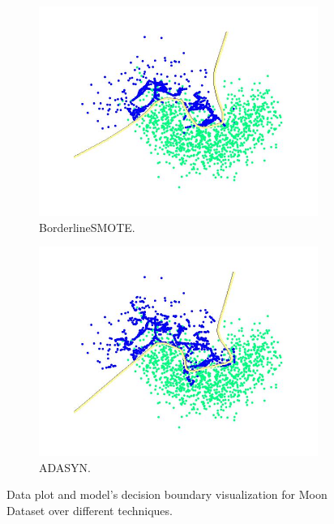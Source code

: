 \begin{figure}[th]
\begin{subfigure}[]{0.3\linewidth}
		\includegraphics[width=\linewidth]{Figures/moon/Training_Data_PLot_BorderlineSMOTE}
		\caption{BorderlineSMOTE.}
		\label{fig:border_smote_moon}
	\end{subfigure}
	\hspace{0.1em}%
	\begin{subfigure}[]{0.3\linewidth}
		\includegraphics[width=\linewidth]{Figures/moon/Training_Data_PLot_ADASYN}
		\caption{ADASYN. }
		\label{fig:adasyn_moon}
	\end{subfigure}
	
	\caption{Data plot and model's decision boundary visualization for Moon Dataset over different techniques.}
	\label{fig:MoonResults}
\end{figure}

